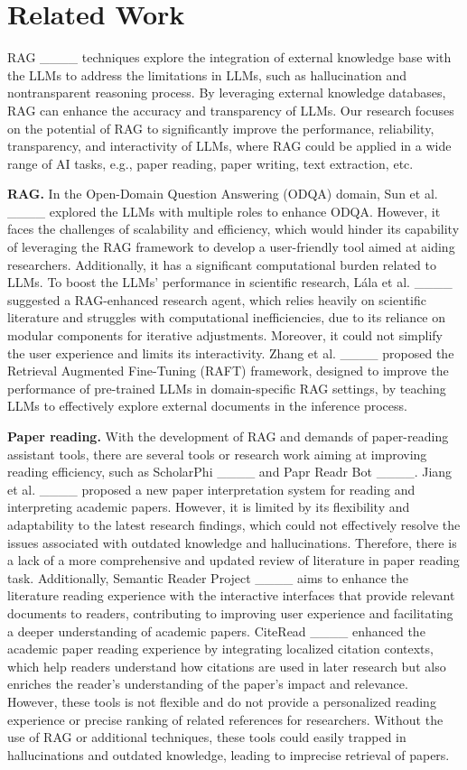 \section{Related Work}
RAG ____ techniques explore the integration of external knowledge base with the LLMs to address the limitations in LLMs, such as hallucination and nontransparent reasoning process. By leveraging external knowledge databases, RAG can enhance the accuracy and transparency of LLMs. Our research focuses on the potential of RAG to significantly improve the performance, reliability, transparency, and interactivity of LLMs, where RAG could be applied in a wide range of AI tasks, e.g., paper reading, paper writing, text extraction, etc.

\textbf{RAG.} In the Open-Domain Question Answering (ODQA) domain, Sun et al. ____ explored the LLMs with multiple roles to enhance ODQA. However, it faces the challenges of scalability and efficiency, which would hinder its capability of leveraging the RAG framework to develop a user-friendly tool aimed at aiding researchers. Additionally, it has a significant computational burden related to LLMs. To boost the LLMs' performance in scientific research, L\'ala et al. ____ suggested a RAG-enhanced research agent, which relies heavily on scientific literature and struggles with computational inefficiencies, due to its reliance on modular components for iterative adjustments. Moreover, it could not simplify the user experience and limits its interactivity. Zhang et al. ____ proposed the Retrieval Augmented Fine-Tuning (RAFT) framework, designed to improve the performance of pre-trained LLMs in domain-specific RAG settings, by teaching LLMs to effectively explore external documents in the inference process.

\textbf{Paper reading.} With the development of RAG and demands of paper-reading assistant tools, there are several tools or research work aiming at improving reading efficiency, such as ScholarPhi ____ and Papr Readr Bot ____. Jiang et al. ____ proposed a new paper interpretation system for reading and interpreting academic papers. However, it is limited by its flexibility and adaptability to the latest research findings, which could not effectively resolve the issues associated with outdated knowledge and hallucinations. Therefore, there is a lack of a more comprehensive and updated review of literature in paper reading task.
Additionally, Semantic Reader Project ____ aims to enhance the literature reading experience with the interactive interfaces that provide relevant documents to readers, contributing to improving user experience and facilitating a deeper understanding of academic papers. CiteRead ____ enhanced the academic paper reading experience by integrating localized citation contexts, which help readers understand how citations are used in later research but also enriches the reader's understanding of the paper's impact and relevance. However, these tools is not flexible and do not provide a personalized reading experience or precise ranking of related references for researchers. Without the use of RAG or additional techniques, these tools could easily trapped in hallucinations and outdated knowledge, leading to imprecise retrieval of papers.